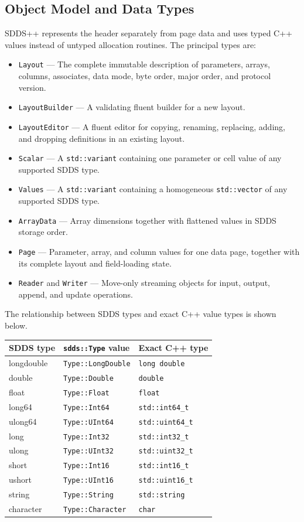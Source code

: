 \documentclass[11pt]{article}
\begin{document}
\subsection{Object Model and Data Types}

SDDS++ represents the header separately from page data and uses typed C++
values instead of untyped allocation routines.  The principal types are:

\begin{itemize}
\item {\tt Layout} --- The complete immutable description of parameters,
arrays, columns, associates, data mode, byte order, major order, and protocol
version.
\item {\tt LayoutBuilder} --- A validating fluent builder for a new layout.
\item {\tt LayoutEditor} --- A fluent editor for copying, renaming, replacing,
adding, and dropping definitions in an existing layout.
\item {\tt Scalar} --- A {\tt std::variant} containing one parameter or cell
value of any supported SDDS type.
\item {\tt Values} --- A {\tt std::variant} containing a homogeneous
{\tt std::vector} of any supported SDDS type.
\item {\tt ArrayData} --- Array dimensions together with flattened values in
SDDS storage order.
\item {\tt Page} --- Parameter, array, and column values for one data page,
together with its complete layout and field-loading state.
\item {\tt Reader} and {\tt Writer} --- Move-only streaming objects for input,
output, append, and update operations.
\end{itemize}

The relationship between SDDS types and exact C++ value types is shown below.

\begin{center}
\begin{tabular}{lll}
SDDS type & {\tt sdds::Type} value & Exact C++ type \\
\hline
longdouble & {\tt Type::LongDouble} & {\tt long double} \\
double & {\tt Type::Double} & {\tt double} \\
float & {\tt Type::Float} & {\tt float} \\
long64 & {\tt Type::Int64} & {\tt std::int64\_t} \\
ulong64 & {\tt Type::UInt64} & {\tt std::uint64\_t} \\
long & {\tt Type::Int32} & {\tt std::int32\_t} \\
ulong & {\tt Type::UInt32} & {\tt std::uint32\_t} \\
short & {\tt Type::Int16} & {\tt std::int16\_t} \\
ushort & {\tt Type::UInt16} & {\tt std::uint16\_t} \\
string & {\tt Type::String} & {\tt std::string} \\
character & {\tt Type::Character} & {\tt char} \\
\end{tabular}
\end{center}
\end{document}
